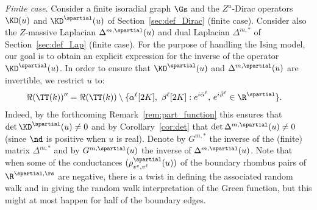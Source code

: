 \documentclass[a4paper,twoside,11pt]{article}
\begin{document}
\emph{Finite case}.
Consider a finite isoradial graph $\Gs$ and the $Z^u$-Dirac operators $\KD(u)$ and $\KD^\spartial(u)$ of 
Section~\ref{sec:def_Dirac} (finite case). Consider also the $Z$-massive Laplacian $\Delta^{m,\spartial}(u)$ and dual Laplacian $\Delta^{m,*}$
of Section~\ref{sec:def_Lap} (finite case). For the purpose of handling the Ising model, our goal is to 
obtain an explicit expression for the inverse of the operator $\KD^\spartial(u)$. In order to ensure that $\KD^\spartial(u)$ and 
$\Delta^{m,\spartial}(u)$ are invertible, we restrict $u$ to:
\begin{align}
\Re(\TT(k))''&=\Re(\TT(k))\setminus\{\alpha^\ell[2K],\ \beta^{\ell}[2K]:e^{i\bar{\alpha}^\ell},\,e^{i\bar{\beta}^\ell}\in\R^\spartial\}.
\end{align}
Indeed, by the forthcoming Remark~\ref{rem:part_function} this ensures that $\det \KD^\spartial(u)\neq 0$ and by Corollary~\ref{cor:det} that 
$\det\Delta^{m,\spartial}(u)\neq 0$ (since $\nd$ is positive when $u$ is real).
Denote by $G^{m,*}$ the inverse of the (finite) matrix $\Delta^{m,*}$ and by
$G^{m,\spartial}(u)$ the inverse of $\Delta^{m,\spartial}(u)$. 
Note that when some of the conductances $(\rho^\spartial_{v^c,v^\ell}(u))$ of the boundary rhombus 
pairs of $\R^{\spartial,\rs}$ are negative, there is a twist in defining the associated random walk and in giving
the random walk interpretation of the Green function, but this might at most happen for half of the boundary edges.
\end{document}
